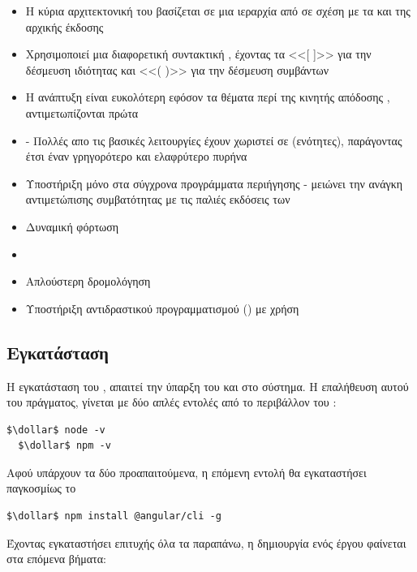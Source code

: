 \begin{itemize}
    \item Η κύρια αρχιτεκτονική του βασίζεται σε μια ιεραρχία από  σε σχέση με τα  και  της αρχικής έκδοσης
    \item Χρησιμοποιεί μια διαφορετική συντακτική , έχοντας τα <<[ ]>> για την δέσμευση ιδιότητας και <<( )>> για την δέσμευση συμβάντων
    \item Η ανάπτυξη είναι ευκολότερη εφόσον τα θέματα περί της κινητής απόδοσης , αντιμετωπίζονται πρώτα
    \item {} - Πολλές απο τις βασικές λειτουργίες έχουν χωριστεί σε  (ενότητες), παράγοντας έτσι έναν γρηγορότερο και ελαφρύτερο πυρήνα
    \item Υποστήριξη μόνο στα σύγχρονα προγράμματα περιήγησης - μειώνει την ανάγκη αντιμετώπισης συμβατότητας με τις παλιές εκδόσεις των 
    \item Δυναμική φόρτωση
    \item {}
    \item Απλούστερη δρομολόγηση
    \item Υποστήριξη αντιδραστικού προγραμματισμού () με χρήση  
\end{itemize}

\subsection*{Εγκατάσταση}
\quad Η εγκατάσταση του , απαιτεί την ύπαρξη του  και  στο σύστημα. Η επαλήθευση αυτού του πράγματος, γίνεται με δύο απλές εντολές από το περιβάλλον του :

\begin{lstlisting}[language=command.com]
  $\dollar$ node -v
  $\dollar$ npm -v
\end{lstlisting}

Αφού υπάρχουν τα δύο προαπαιτούμενα, η επόμενη εντολή θα εγκαταστήσει παγκοσμίως το 

\begin{lstlisting}[language=command.com]
$\dollar$ npm install @angular/cli -g
\end{lstlisting}

Έχοντας εγκαταστήσει επιτυχής όλα τα παραπάνω, η δημιουργία ενός  έργου φαίνεται στα επόμενα βήματα:

